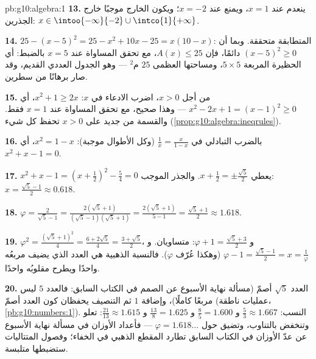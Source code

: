 \begin{solution}{pb:g10:algebra:1}
\textbf{13.} ينعدم عند $x = 1$، ويمنع عند $x = -2$؛ ويكون
الخارج موجبًا خارج الجذرين:
$x \in \intoo{-\infty}{-2} \cup \intco{1}{+\infty}$.

\textbf{14.} $25 - (x - 5)^2 = 25 - x^2 + 10x - 25 =
x(10 - x)$: المتطابقة متحققة. وبما أن $(x-5)^2 \geq 0$ دائمًا،
فإن $A(x) \leq 25$، مع تحقق المساواة عند $x = 5$ بالضبط: أي
الحظيرة المربعة $5 \times 5$، ومساحتها العظمى $25$ م$^2$ --- وهو
الجدول العددي القديم، وقد صار برهانًا من سطرين.

\textbf{15.} من أجل $x > 0$، اضرب الادعاء في $x$:
$x^2 + 1 \geq 2x$، أي $x^2 - 2x + 1 = (x - 1)^2 \geq 0$ ---
وهذا صحيح، مع تحقق المساواة عند $x = 1$ فقط. والقسمة من جديد على $x > 0$
تحفظ كل شيء (\cref{prop:g10:algebra:ineqrules}).

\textbf{16.} بالضرب التبادلي في $\frac1x = \frac{x}{1 - x}$
(وكل الأطوال موجبة): $x^2 = 1 - x$، أي
$x^2 + x - 1 = 0$.

\textbf{17.} $x^2 + x - 1 = \left(x + \frac12\right)^2 -
\frac54 = 0$ يعطي $x + \frac12 = \pm\frac{\sqrt5}{2}$. والجذر
الموجب: $x = \frac{\sqrt5 - 1}{2} \approx 0.618$.

\textbf{18.} $\varphi = \frac{2}{\sqrt5 - 1} =
\frac{2(\sqrt5 + 1)}{(\sqrt5 - 1)(\sqrt5 + 1)}
= \frac{2(\sqrt5 + 1)}{5 - 1} = \frac{\sqrt5 + 1}{2}
\approx 1.618$.

\textbf{19.} $\varphi^2 = \frac{(\sqrt5 + 1)^2}{4} =
\frac{6 + 2\sqrt5}{4} = \frac{3 + \sqrt5}{2}$، و
$\varphi + 1 = \frac{\sqrt5 + 3}{2}$: متساويان. و
$\varphi - 1 = \frac{\sqrt5 - 1}{2} = x = \frac1\varphi$ (وهكذا
عُرّف $\varphi$). فالنسبة الذهبية هي العدد الذي
يضيف مربعُه واحدًا ويطرح مقلوبُه واحدًا.

\textbf{20.} العدد $\sqrt5$ أصمّ (مسألة نهاية الأسبوع عن الصمم في الكتاب السابق: فالعدد $5$
ليس مربعًا كاملًا)، وإضافة $1$ ثم التنصيف يحفظان
كون العدد أصمّ (عمليات ناطقة، \cref{pb:g10:numbers:1}).
النسب: $\frac53 \approx 1.667$ و $\frac85 = 1.600$ و
$\frac{13}{8} = 1.625$ و $\frac{21}{13} \approx 1.615$:
تعلو وتنخفض بالتناوب، وتضيق حول
$\varphi = 1.618\ldots$ --- فأعداد الأوزان في
مسألة نهاية الأسبوع عن عدّ الأوزان في الكتاب السابق تطارد المقطع الذهبي في الخفاء؛
وفصول المتتاليات ستضبطها متلبسة.
\end{solution}
